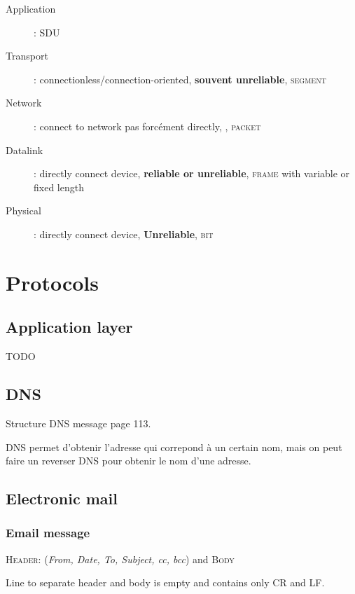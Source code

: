 \begin{description}
    \item[Application] : \textsc{SDU}
    \item[Transport] : connectionless/connection-oriented, \textbf{souvent unreliable}, \textsc{segment}
    \item[Network] : connect to network pas forcément directly, , \textsc{packet}
    \item[Datalink] : directly connect device, \textbf{reliable or unreliable}, \textsc{frame} with variable or fixed length
    \item[Physical] : directly connect device, \textbf{Unreliable}, \textsc{bit}
\end{description}


\section{Protocols}

\subsection{Application layer}
TODO

\subsection{DNS}
Structure DNS message page 113.

DNS permet d'obtenir l'adresse qui correpond à un certain nom, mais on peut
faire un reverser DNS pour obtenir le nom d'une adresse.

\subsection{Electronic mail}

\subsubsection{Email message}
\textsc{Header:} (\textit{From, Date, To, Subject,  cc, bcc}) and \textsc{Body}

Line to separate header and body is empty and contains only CR and LF.

